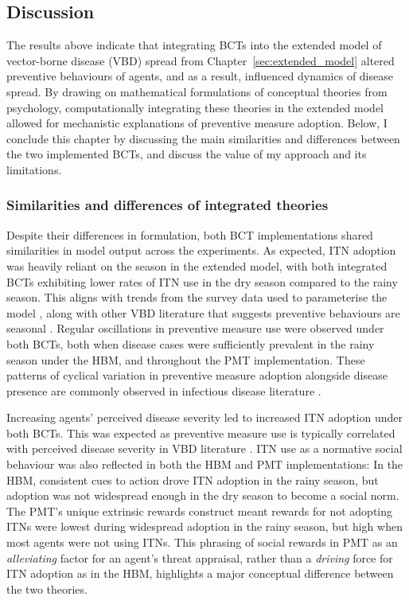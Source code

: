\subsection{Discussion}\label{sec:bcts-discussion}

The results above indicate that integrating BCTs into the extended model of vector-borne disease (VBD) spread from Chapter~\ref{sec:extended_model} altered preventive behaviours of agents, and as a result, influenced dynamics of disease spread. By drawing on mathematical formulations of conceptual theories from psychology, computationally integrating these theories in the extended model allowed for mechanistic explanations of preventive measure adoption. Below, I conclude this chapter by discussing the main similarities and differences between the two implemented BCTs, and discuss the value of my approach and its limitations.

\subsubsection{Similarities and differences of integrated theories}

Despite their differences in formulation, both BCT implementations shared similarities in model output across the experiments. As expected, ITN adoption was heavily reliant on the season in the extended model, with both integrated BCTs exhibiting lower rates of ITN use in the dry season compared to the rainy season. This aligns with trends from the survey data used to parameterise the model \cite{sandfort_forest_2020, vantaux_anopheles_2021}, along with other VBD literature that suggests preventive behaviours are seasonal \cite{phok_behavioural_2022, watanabe_determinants_2014}. Regular oscillations in preventive measure use were observed under both BCTs, both when disease cases were sufficiently prevalent in the rainy season under the HBM, and throughout the PMT implementation. These patterns of cyclical variation in preventive measure adoption alongside disease presence are commonly observed in infectious disease literature \cite{anderson_oscillatory_1984}. 

Increasing agents' perceived disease severity led to increased ITN adoption under both BCTs. This was expected as preventive measure use is typically correlated with perceived disease severity in VBD literature \cite{watanabe_determinants_2014,kakaire_role_2023,raude_public_2012,naserrudin_role_2022}. ITN use as a normative social behaviour was also reflected in both the HBM and PMT implementations: In the HBM, consistent cues to action drove ITN adoption in the rainy season, but adoption was not widespread enough in the dry season to become a social norm. The PMT's unique extrinsic rewards construct meant rewards for not adopting ITNs were lowest during widespread adoption in the rainy season, but high when most agents were not using ITNs. This phrasing of social rewards in PMT as an \textit{alleviating} factor for an agent's threat appraisal, rather than a \textit{driving} force for ITN adoption as in the HBM, highlights a major conceptual difference between the two theories.

